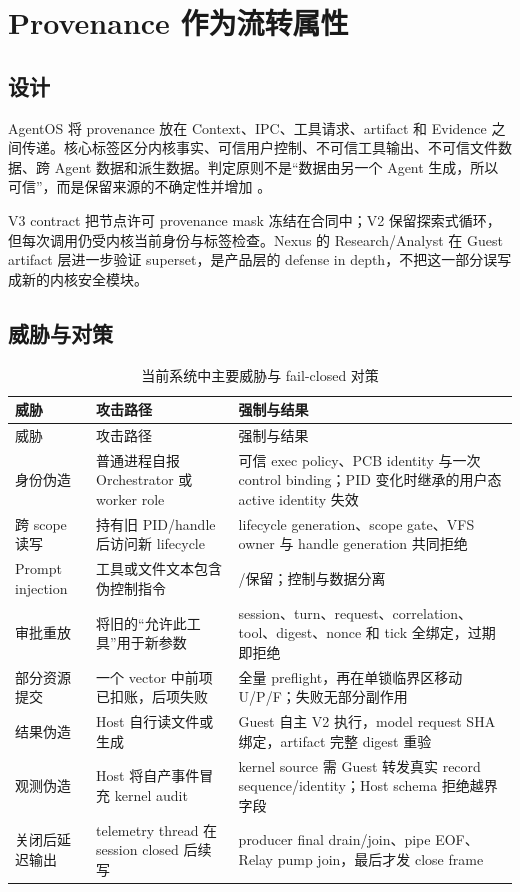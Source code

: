 \section{Provenance 作为流转属性}

\subsection{设计}

AgentOS 将 provenance 放在 Context、IPC、工具请求、artifact 和 Evidence 之间传递。核心标签区分内核事实、可信用户控制、不可信工具输出、不可信文件数据、跨 Agent 数据和派生数据。判定原则不是“数据由另一个 Agent 生成，所以可信”，而是保留来源的不确定性并增加 。

V3 contract 把节点许可 provenance mask 冻结在合同中；V2 保留探索式循环，但每次调用仍受内核当前身份与标签检查。Nexus 的 Research/Analyst 在 Guest artifact 层进一步验证 superset，是产品层的 defense in depth，不把这一部分误写成新的内核安全模块。

\subsection{威胁与对策}

\begin{longtable}{L{3.0cm}L{4.0cm}L{6.3cm}}
  \caption{当前系统中主要威胁与 fail-closed 对策}\label{tab:threats}\\
  \toprule
  威胁 & 攻击路径 & 强制与结果 \\
  \midrule
  \endfirsthead
  \toprule
  威胁 & 攻击路径 & 强制与结果 \\
  \midrule
  \endhead
  身份伪造 & 普通进程自报 Orchestrator 或 worker role & 可信 exec policy、PCB identity 与一次 control binding；PID 变化时继承的用户态 active identity 失效 \\
  跨 scope 读写 & 持有旧 PID/handle 后访问新 lifecycle & lifecycle generation、scope gate、VFS owner 与 handle generation 共同拒绝 \\
  Prompt injection & 工具或文件文本包含伪控制指令 & /保留；控制与数据分离 \\
  审批重放 & 将旧的“允许此工具”用于新参数 & session、turn、request、correlation、tool、digest、nonce 和 tick 全绑定，过期即拒绝 \\
  部分资源提交 & 一个 vector 中前项已扣账，后项失败 & 全量 preflight，再在单锁临界区移动 U/P/F；失败无部分副作用 \\
  结果伪造 & Host 自行读文件或生成  & Guest 自主 V2 执行，model request SHA 绑定，artifact 完整 digest 重验 \\
  观测伪造 & Host 将自产事件冒充 kernel audit & kernel source 需 Guest 转发真实 record sequence/identity；Host schema 拒绝越界字段 \\
  关闭后延迟输出 & telemetry thread 在 session closed 后续写 & producer final drain/join、pipe EOF、Relay pump join，最后才发 close frame \\
  \bottomrule
\end{longtable}

